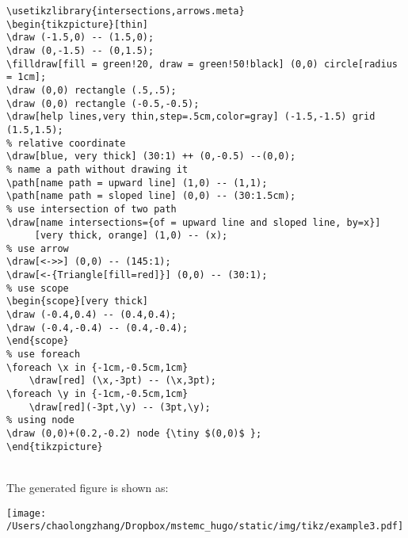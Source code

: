 \documentclass[koma,utopia,a4paper,captions=tableheading,11pt,listings-sv,microtype,paralist,colorlinks=true,urlcolor=blue]{org-article}
\begin{document}
\begin{lstlisting}
\usetikzlibrary{intersections,arrows.meta}
\begin{tikzpicture}[thin]
\draw (-1.5,0) -- (1.5,0);
\draw (0,-1.5) -- (0,1.5);
\filldraw[fill = green!20, draw = green!50!black] (0,0) circle[radius = 1cm];
\draw (0,0) rectangle (.5,.5);
\draw (0,0) rectangle (-0.5,-0.5);
\draw[help lines,very thin,step=.5cm,color=gray] (-1.5,-1.5) grid (1.5,1.5);
% relative coordinate
\draw[blue, very thick] (30:1) ++ (0,-0.5) --(0,0);
% name a path without drawing it
\path[name path = upward line] (1,0) -- (1,1);
\path[name path = sloped line] (0,0) -- (30:1.5cm);
% use intersection of two path
\draw[name intersections={of = upward line and sloped line, by=x}]
     [very thick, orange] (1,0) -- (x);
% use arrow
\draw[<->>] (0,0) -- (145:1);
\draw[<-{Triangle[fill=red]}] (0,0) -- (30:1);
% use scope
\begin{scope}[very thick]
\draw (-0.4,0.4) -- (0.4,0.4);
\draw (-0.4,-0.4) -- (0.4,-0.4);
\end{scope}
% use foreach
\foreach \x in {-1cm,-0.5cm,1cm}
    \draw[red] (\x,-3pt) -- (\x,3pt);
\foreach \y in {-1cm,-0.5cm,1cm}
    \draw[red](-3pt,\y) -- (3pt,\y);
% using node
\draw (0,0)+(0.2,-0.2) node {\tiny $(0,0)$ };
\end{tikzpicture}
\end{lstlisting}


\hspace{0pt}\\
The generated figure is shown as:
\begin{center}
\texttt{[image: /Users/chaolongzhang/Dropbox/mstemc\_hugo/static/img/tikz/example3.pdf]}
\end{center}
\end{document}
